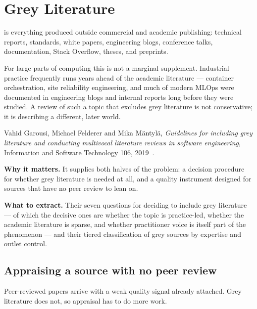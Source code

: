 \section{Grey Literature}

 is everything produced outside commercial and academic
publishing: technical reports, standards, white papers, engineering blogs,
conference talks, documentation, Stack Overflow, theses, and preprints.

For large parts of computing this is not a marginal supplement. Industrial
practice frequently runs years ahead of the academic literature --- container
orchestration, site reliability engineering, and much of modern MLOps were
documented in engineering blogs and internal reports long before they were
studied. A review of such a topic that excludes grey literature is not
conservative; it is describing a different, later world.

\begin{paperbox}
Vahid Garousi, Michael Felderer and Mika M{\"a}ntyl{\"a}, \emph{Guidelines for
including grey literature and conducting multivocal literature reviews in
software engineering}, Information and Software Technology 106,
2019~\cite{garousi2019guidelines}.

\medskip
\textbf{Why it matters.} It supplies both halves of the problem: a decision
procedure for whether grey literature is needed at all, and a quality
instrument designed for sources that have no peer review to lean on.

\medskip
\textbf{What to extract.} Their seven questions for deciding to include grey
literature --- of which the decisive ones are whether the topic is
practice-led, whether the academic literature is sparse, and whether
practitioner voice is itself part of the phenomenon --- and their tiered
classification of grey sources by expertise and outlet control.
\end{paperbox}

\subsection{Appraising a source with no peer review}

Peer-reviewed papers arrive with a weak quality signal already attached. Grey
literature does not, so appraisal has to do more work.

